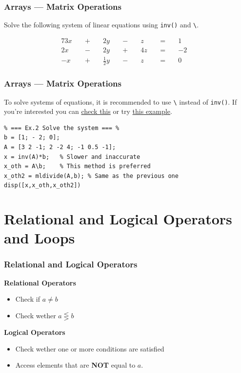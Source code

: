 \documentclass[11pt,xcolor={svgnames},aspectratio=169,usepdftitle=false]{beamer}
\begin{document}
\begin{frame}[fragile]
    \frametitle{Arrays --- Matrix Operations}
\begin{exercise} 
Solve the following system of linear equations using \verb;inv(); and \verb;\;.

\begin{alignat*}{7}
3x&& \; + \; &&2y&& \; - \; &&z&& \; = \; &&1&\\
2x&& \; - \; &&2y&& \; + \; &&4z&& \; = \; &&-2&\\
-x&& \; + \; &&{\tfrac {1}{2}}y&& \; - \; &&z&& \; = \; &&0&
\end{alignat*}
\end{exercise}
\end{frame}

\begin{frame}[fragile]
    \frametitle{Arrays --- Matrix Operations}
To solve systems of equations, it is recommended to use \verb;\; instead of \verb;inv();. If you're interested you can \href{https://www.mathworks.com/matlabcentral/answers/139778-what-is-the-difference-between-inv-and-the-backslash#answer_143286}{check this} or try \href{https://www.mathworks.com/help/matlab/ref/inv.html#bu6sfy8-1}{this example}.
\begin{lstlisting}
% === Ex.2 Solve the system === %
b = [1; - 2; 0];
A = [3 2 -1; 2 -2 4; -1 0.5 -1];
x = inv(A)*b;   % Slower and inaccurate
x_oth = A\b;    % This method is preferred
x_oth2 = mldivide(A,b); % Same as the previous one
disp([x,x_oth,x_oth2])
\end{lstlisting}
\end{frame}

\section{Relational and Logical Operators and Loops}

\begin{frame}
    \frametitle{Relational and Logical Operators}
    \alert{\textbf{Relational Operators}}
\begin{itemize}
    \item Check if $a\neq b$
    \item Check wether $a \lesseqgtr b$
\end{itemize}

\alert{\textbf{Logical Operators}}
\begin{itemize}
    \item Check wether one or more conditions are satisfied
    \item Access elements that are \alert{\textbf{NOT}} equal to $a$.
\end{itemize}
\end{frame}
\end{document}
